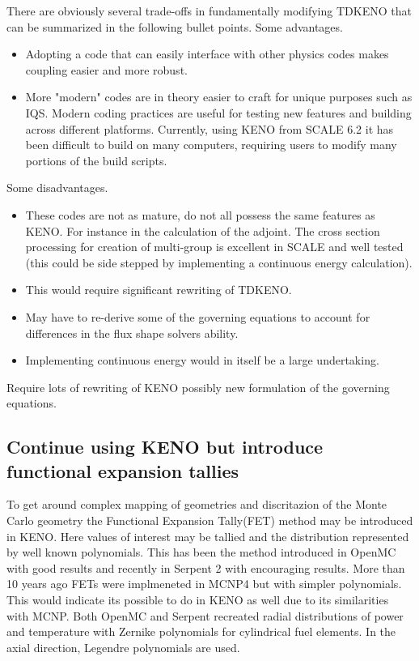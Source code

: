\documentclass[11pt]{article}
\begin{document}
	There are obviously several trade-offs in fundamentally modifying TDKENO that can be summarized in the following bullet points.
	Some advantages.  
	\begin{itemize}
	\item Adopting a code that can easily interface with other physics codes makes coupling easier and more robust.  
	\item More "modern" codes are in theory easier to craft for unique purposes such as IQS.  Modern coding practices are useful for testing new features and building across different platforms.  Currently, using KENO from SCALE 6.2 it has been difficult to build on many computers, requiring users to modify many portions of the build scripts. 
	\end{itemize}		
	Some disadvantages.
	\begin{itemize}
	\item These codes are not as mature, do not all possess the same features as KENO.  For instance in the calculation of the adjoint. The cross section processing for creation of multi-group is excellent in SCALE and well tested (this could be side stepped by implementing a continuous energy calculation).
	\item This would require significant rewriting of TDKENO.
	\item May have to re-derive some of the governing equations to account for differences in the flux shape solvers ability.
	\item Implementing continuous energy would in itself be a large undertaking.  
	\end{itemize}
	  Require lots of rewriting of KENO possibly new formulation of the governing equations.

\subsection{Continue using KENO but introduce functional expansion tallies}
To get around complex mapping of geometries and discritazion of the Monte Carlo geometry the Functional Expansion Tally(FET) method may be introduced in KENO.  Here values of interest may be tallied and the distribution represented by well known polynomials.  This has been the method introduced in OpenMC with good results and recently in Serpent 2 with encouraging results.  More than 10 years ago FETs were implmeneted in MCNP4 \cite{griesheimer2004two} but with simpler polynomials. This would indicate its possible to do in KENO as well due to its similarities with MCNP. Both OpenMC and Serpent recreated radial distributions of power and temperature with Zernike polynomials  for cylindrical fuel elements. In the axial direction, Legendre polynomials are used. 
\end{document}
